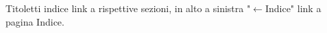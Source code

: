 	\maketitle\thispagestyle{empty}

\begin{center}
	\tiny Titoletti indice link a rispettive sezioni, in alto a sinistra "$\leftarrow$Indice" link a pagina Indice.
\end{center}

\tableofcontents\label{toc}